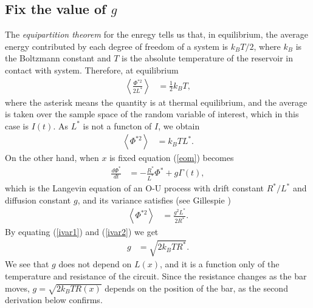 \documentclass[11pt]{article}
\begin{document}
\subsection{Fix the value of $g$}
The {\it equipartition theorem} for the enregy tells us that, in equilibrium, the average energy contributed by each degree of freedom of a system is $k_BT/2$, where $k_B$ is the Boltzmann constant and $T$ is the absolute temperature of the reservoir in contact with system. Therefore, at equilibrium
\begin{align}
  \left<\frac{\Phi^{*2}}{2L^*}\right>&=\frac{1}{2}k_BT,
\end{align}
where the asterisk means the quantity is at thermal equilibrium, and the average is taken over the sample space of the random variable of interest, which in this case is $I(t)$. As $L^*$ is not a functon of $I$, we obtain
\begin{align}
  \left<\Phi^{*2}\right>&=k_BTL^*.
  \label{ivar1}
\end{align}
On the other hand, when $x$ is fixed equation (\ref{eom}) becomes
\begin{align}
  \frac{d\Phi^*}{dt}&=-\frac{R^*}{L^*}\Phi^*+g\Gamma(t),
\end{align}
which is the Langevin equation of an O-U process with drift constant $R^*/L^*$ and diffusion constant $g$, and its variance satisfies (see Gillespie \cite{gillespie})
\begin{align}
  \left<\Phi^{*2}\right>&=\frac{g^2L^*}{2R^*}.
  \label{ivar2}
\end{align}
By equating (\ref{ivar1}) and (\ref{ivar2}) we get
\begin{align}
  g&=\sqrt{2k_BTR^*}.
\end{align}
We see that $g$ does not depend on $L(x)$, and it is a function only of the temperature and resistance of the circuit. Since the resistance changes as the bar moves, $g=\sqrt{2k_BTR(x)}$ depends on the position of the bar, as the second derivation below confirms.\\
\end{document}
